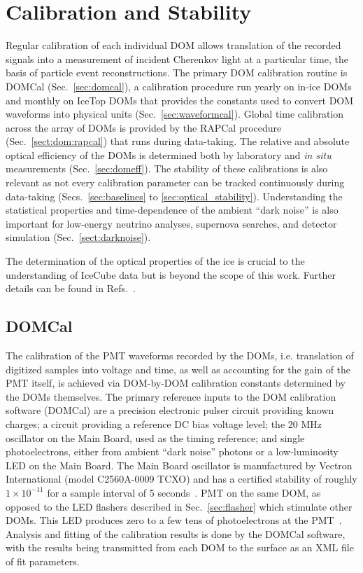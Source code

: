 \section{\label{sec:dom_calibration}Calibration and Stability}

Regular calibration of each individual DOM allows translation of the
recorded signals into a measurement of incident Cherenkov light at a
particular time, the basis of particle event reconstructions.  The
primary DOM calibration routine is DOMCal (Sec.~\ref{sec:domcal}), a
calibration procedure run yearly on in-ice DOMs and monthly on IceTop
DOMs that provides the constants used to convert DOM waveforms into
physical units (Sec.~\ref{sec:waveformcal}).  Global time calibration across the array of DOMs is 
provided by the RAPCal procedure (Sec.~\ref{sect:dom:rapcal}) that runs during
data-taking.  The relative and absolute optical efficiency of the DOMs is
determined both by laboratory and \emph{in situ} measurements
(Sec.~\ref{sec:domeff}). The stability of these calibrations is also relevant
as not every calibration parameter can be tracked continuously during
data-taking (Secs.~\ref{sec:baselines} to \ref{sec:optical_stability}).
Understanding the statistical properties and time-dependence of the ambient ``dark
noise'' is also important for low-energy neutrino analyses, supernova
searches, and detector simulation (Sec.~\ref{sect:darknoise}).

The determination of the optical properties of the ice is crucial to
the understanding of IceCube data but is beyond the scope of this work.
Further details can be found in Refs.~\cite{Aartsen:2013rt,IC3:spice_lea}.

\subsection{\label{sec:domcal}DOMCal}

The calibration of the PMT waveforms recorded by the DOMs, i.e. translation
of digitized samples into voltage and time, as well as accounting for the
gain of the PMT itself, is achieved via DOM-by-DOM calibration constants
determined by the DOMs themselves. The primary reference inputs to
the DOM calibration software (DOMCal) are a precision electronic
pulser circuit providing known charges; a circuit providing a reference DC
bias voltage level; the 20 MHz oscillator on the Main
Board, used as the timing reference; and single photoelectrons, either from
ambient ``dark noise'' photons or a low-luminosity LED on the Main
Board.  The Main Board oscillator is manufactured by Vectron
International (model C2560A-0009 TCXO) and has a certified stability
of roughly $1 \times 10^{-11}$ for a sample interval of 5 seconds~\cite{ICECUBE:DAQ}.
PMT on the same DOM, as opposed to the LED flashers described in
Sec.~\ref{sec:flasher} which stimulate other DOMs. This LED produces
zero to a few tens of photoelectrons at the PMT~\cite{ICECUBE:DAQ}. Analysis and fitting of the
calibration results is done by the DOMCal software, with the results being
transmitted from each DOM to the surface as an XML file of fit parameters.

